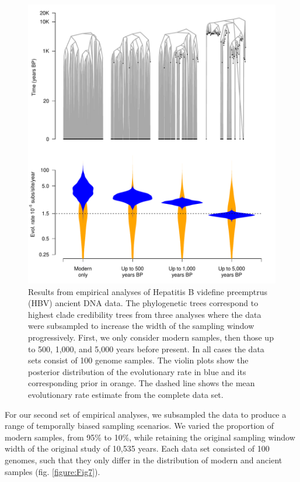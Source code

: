 \documentclass[11pt]{article}
\begin{document}
\begin{figure}[H]
    \begin{center}
        \includegraphics[scale=0.7, angle=0]{empirical_results_depth.pdf}
        \caption{Results from empirical analyses of Hepatitis B videfine preemptrus (HBV) ancient DNA data. The phylogenetic trees correspond to highest clade credibility trees from three analyses where the data were subsampled to increase the width of the sampling window progressively. First, we only consider modern samples, then those up to 500, 1,000, and 5,000 years before present. In all cases the data sets consist of 100 genome samples. The violin plots show the posterior distribution of the evolutionary rate in blue and its corresponding prior in orange. The dashed line shows the mean evolutionary rate estimate from the complete data set.}
        \label{figure:Fig6}
    \end{center}
\end{figure}

For our second set of empirical analyses, we subsampled the data to produce a range of temporally biased sampling scenarios. We varied the proportion of modern samples, from 95\% to 10\%, while retaining the original sampling window width of the original study of 10,535 years. Each data set consisted of 100 genomes, such that they only differ in the distribution of modern and ancient samples (fig. \ref{figure:Fig7}). 
\end{document}
